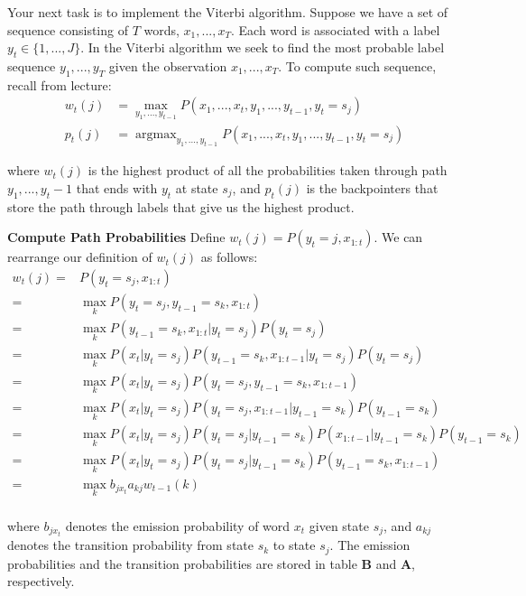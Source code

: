 \documentclass{article}
\newcommand{\argmax}{\mathop{\mathrm{argmax}}}
\begin{document}
Your next task is to implement the Viterbi algorithm. Suppose we have a set of sequence consisting of $T$ words, $x_1,...,x_T$. Each word is associated with a label $y_t\in\{1,...,J\}$. In the Viterbi algorithm we seek to find the most probable label sequence $y_1, ..., y_T$ given the observation $x_1,...,x_T$. To compute such sequence, recall from lecture: 
\begin{align*}
    w_t(j) &= \max_{y_1,...,y_{t-1}} P(x_1, ..., x_t, y_1, ..., y_{t-1}, y_t=s_j)\\ 
    p_t(j) &= \argmax_{y_1,...,y_{t-1}} P(x_1, ..., x_t, y_1, ..., y_{t-1}, y_t=s_j)
\end{align*}

where $w_t(j)$ is the highest product of all the probabilities taken through path $y_1, ..., y_t-1$ that ends with $y_t$ at state $s_j$, and $p_t(j)$ is the backpointers that store the path through labels that give us the highest product.

\textbf{Compute Path Probabilities}
Define $w_t(j) = P(y_t = j, x_{1:t})$. We can rearrange our definition of $w_t(j)$ as follows:
\begin{align*}
    w_t(j)
    =&P(y_t=s_j, x_{1:t}) \\
    =& \max_{k} P(y_t=s_j, y_{t-1}=s_k, x_{1:t}) \\
    =& \max_{k} P(y_{t-1}=s_k, x_{1:t} \vert y_t = s_j) P(y_t = s_j) \\
    =& \max_{k} P(x_t \vert y_t = s_j) P(y_{t-1}=s_k, x_{1:t-1} \vert y_t = s_j) P(y_t = s_j) \\
    =& \max_{k} P(x_t \vert y_t = s_j) P(y_t = s_j, y_{t-1}=s_k, x_{1:t-1}) \\
    =& \max_{k} P(x_t \vert y_t = s_j) P(y_t = s_j, x_{1:t-1} \vert y_{t-1}=s_k) P(y_{t-1}=s_k) \\
    =& \max_{k} P(x_t \vert y_t = s_j) P(y_t = s_j \vert y_{t-1}=s_k) P(x_{1:t-1} \vert y_{t-1}=s_k) P(y_{t-1}=s_k) \\
    =& \max_{k} P(x_t \vert y_t = s_j) P(y_t = s_j \vert y_{t-1}=s_k) P(y_{t-1}=s_k, x_{1:t-1}) \\
    =& \max_{k} b_{jx_t} a_{kj} w_{t-1}(k) \\
\end{align*}

where $b_{jx_t}$ denotes the emission probability of word $x_t$ given state $s_j$, and $a_{kj}$ denotes the transition probability from state $s_k$ to state $s_j$. The emission probabilities and the transition probabilities are stored in table $\mathbf{B}$ and $\mathbf{A}$, respectively.
\end{document}
